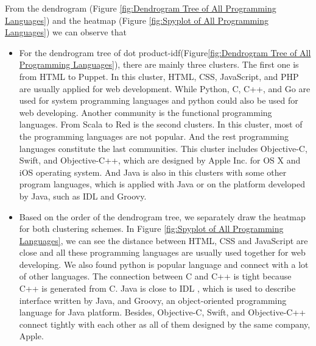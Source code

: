 \documentclass[12pt,oneside,final]{vlsithesis}
\begin{document}
From the dendrogram (Figure \ref {fig:Dendrogram Tree of All Programming Languages}) and the heatmap (Figure \ref{fig:Spyplot of All Programming Languages})  we can observe that
\begin{itemize}
\item  For the dendrogram tree of dot product-idf(Figure\ref {fig:Dendrogram Tree of All Programming Languages}), there are mainly three clusters. The first one is from HTML to Puppet. In this cluster, HTML, CSS, JavaScript, and PHP are usually applied for web development. While Python, C, C++, and Go are used for system programming languages and python could also be used for web developing. Another community is the functional programming languages. From Scala to Red is the second clusters. In this cluster, most of the programming languages are not popular. And the rest programming languages constitute the last communities. This cluster includes Objective-C, Swift, and Objective-C++, which are designed by Apple Inc. for OS X and iOS operating system. And Java is also in this clusters with some other program languages, which is applied with Java or on the platform developed by Java, such as IDL and Groovy. 
\item Based on the order of the dendrogram tree, we separately draw the heatmap for both clustering schemes. In Figure \ref{fig:Spyplot of All Programming Languages}, we can see the distance between HTML, CSS and JavaScript are close and all these programming languages are usually used together for web developing. We also found python is popular language and connect with a lot of other languages. The connection between C and C++ is tight because C++ is generated from C. Java is close to IDL , which is used to describe interface written by Java, and Groovy, an object-oriented programming language for Java platform. Besides, Objective-C, Swift, and Objective-C++ connect tightly with each other as all of them designed by the same company, Apple. 
\end{itemize}
\end{document}
